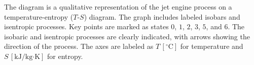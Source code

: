 The diagram is a qualitative representation of the jet engine process on a temperature-entropy (\(T\)-\(S\)) diagram. The graph includes labeled isobars and isentropic processes. Key points are marked as states \(0\), \(1\), \(2\), \(3\), \(5\), and \(6\). The isobaric and isentropic processes are clearly indicated, with arrows showing the direction of the process. The axes are labeled as \(T \, [^\circ\text{C}]\) for temperature and \(S \, [\text{kJ}/\text{kg·K}]\) for entropy.
